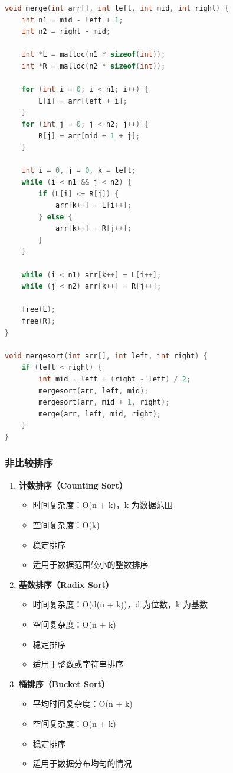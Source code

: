 \begin{lstlisting}[language=C, caption={归并排序实现}]
void merge(int arr[], int left, int mid, int right) {
    int n1 = mid - left + 1;
    int n2 = right - mid;

    int *L = malloc(n1 * sizeof(int));
    int *R = malloc(n2 * sizeof(int));

    for (int i = 0; i < n1; i++) {
        L[i] = arr[left + i];
    }
    for (int j = 0; j < n2; j++) {
        R[j] = arr[mid + 1 + j];
    }

    int i = 0, j = 0, k = left;
    while (i < n1 && j < n2) {
        if (L[i] <= R[j]) {
            arr[k++] = L[i++];
        } else {
            arr[k++] = R[j++];
        }
    }

    while (i < n1) arr[k++] = L[i++];
    while (j < n2) arr[k++] = R[j++];

    free(L);
    free(R);
}

void mergesort(int arr[], int left, int right) {
    if (left < right) {
        int mid = left + (right - left) / 2;
        mergesort(arr, left, mid);
        mergesort(arr, mid + 1, right);
        merge(arr, left, mid, right);
    }
}
\end{lstlisting}

\subsubsection{非比较排序}

\begin{enumerate}
  \item \textbf{计数排序（Counting Sort）}
    \begin{itemize}
      \item 时间复杂度：O(n + k)，k 为数据范围
      \item 空间复杂度：O(k)
      \item 稳定排序
      \item 适用于数据范围较小的整数排序
    \end{itemize}

  \item \textbf{基数排序（Radix Sort）}
    \begin{itemize}
      \item 时间复杂度：O(d(n + k))，d 为位数，k 为基数
      \item 空间复杂度：O(n + k)
      \item 稳定排序
      \item 适用于整数或字符串排序
    \end{itemize}

  \item \textbf{桶排序（Bucket Sort）}
    \begin{itemize}
      \item 平均时间复杂度：O(n + k)
      \item 空间复杂度：O(n + k)
      \item 稳定排序
      \item 适用于数据分布均匀的情况
    \end{itemize}
\end{enumerate}

